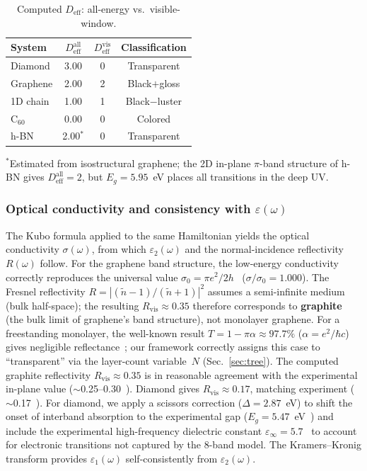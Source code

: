 \documentclass[twocolumn,showpacs,preprintnumbers,amsmath,amssymb,prb]{revtex4-2}
\begin{document}
\begin{table}[h]
\caption{Computed $D_\mathrm{eff}$: all-energy vs.\ visible-window.}
\label{tab:Deff_computed}
\begin{ruledtabular}
\begin{tabular}{lccc}
  System & $D_\mathrm{eff}^\mathrm{all}$ & $D_\mathrm{eff}^\mathrm{vis}$ & Classification \\
  \hline
  Diamond      & 3.00 & 0 & Transparent \\
  Graphene     & 2.00 & 2 & Black$+$gloss \\
  1D chain     & 1.00 & 1 & Black$-$luster \\
  C$_{60}$     & 0.00 & 0 & Colored \\
  h-BN         & 2.00$^*$ & 0 & Transparent \\
\end{tabular}
\end{ruledtabular}
\end{table}
\noindent $^*$Estimated from isostructural graphene; the 2D in-plane
$\pi$-band structure of h-BN gives $D_\mathrm{eff}^\mathrm{all} = 2$,
but $E_g = 5.95$~eV places all transitions in the deep UV.

\subsubsection{Optical conductivity and consistency with
  $\varepsilon(\omega)$}

The Kubo formula applied to the same Hamiltonian yields the optical
conductivity $\sigma(\omega)$, from which $\varepsilon_2(\omega)$ and
the normal-incidence reflectivity $R(\omega)$ follow. For the graphene
band structure, the low-energy conductivity correctly reproduces the
universal value
$\sigma_0 = \pi e^2 / 2h$~\cite{Nair2008,Kuzmenko2008}
($\sigma/\sigma_0 = 1.000$). The Fresnel reflectivity
$R = |(\tilde{n}-1)/(\tilde{n}+1)|^2$ assumes a semi-infinite medium
(bulk half-space); the resulting
$R_\mathrm{vis} \approx 0.35$ therefore corresponds to
\textbf{graphite} (the bulk limit of graphene's band structure), not
monolayer graphene. For a freestanding monolayer, the well-known result
$T = 1 - \pi\alpha \approx 97.7\%$ ($\alpha = e^2/\hbar c$)
gives negligible reflectance~\cite{Nair2008}; our framework correctly
assigns this case to ``transparent'' via the layer-count
variable~$N$ (Sec.~\ref{sec:tree}). The computed graphite reflectivity
$R_\mathrm{vis} \approx 0.35$ is in reasonable agreement with the
experimental in-plane value ($\sim$0.25--0.30~\cite{Taft1965}).
Diamond gives $R_\mathrm{vis} \approx 0.17$, matching
experiment ($\sim$0.17~\cite{Philipp1964}). For diamond, we apply
a scissors correction ($\Delta = 2.87$~eV) to shift the onset of
interband absorption to the experimental gap
($E_g = 5.47$~eV~\cite{Clark1964}) and include the experimental
high-frequency dielectric constant
$\varepsilon_\infty = 5.7$~\cite{Palik1998} to account for electronic
transitions not captured by the 8-band model. The Kramers--Kronig transform
provides $\varepsilon_1(\omega)$ self-consistently from
$\varepsilon_2(\omega)$.
\end{document}
